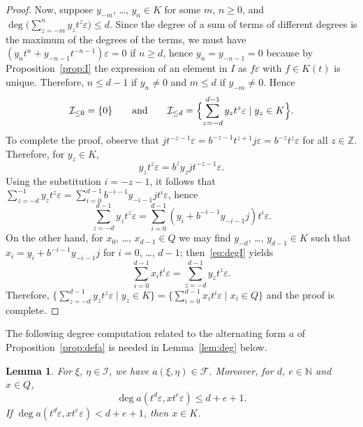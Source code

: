 \documentclass{amsart}
\newcommand{\calI}{\mathcal{I}}
\newcommand{\Z}{\mathbb{Z}}
\newcommand{\fq}{\mathcal{F}}
\newtheorem{lemma}[prop]{Lemma}
\theoremstyle{remark}
\begin{document}
\begin{proof}
  Now, suppose $y_{-m}$, \ldots, $y_n\in K$ for some $m$, $n\geq0$,
  and
  $
    \deg\bigl(\sum_{z=-m}^ny_zt^z\varepsilon\bigr) \leq d.
  $
  Since the degree of a sum of terms of different degrees is the
  maximum of the degrees of the terms, we must have
  $
   (y_nt^n+y_{-n-1}t^{-n-1})\varepsilon = 0$ if $n\geq d$, hence $y_n=y_{-n-1}=0$ because by
    Proposition~\ref{prop:I} the expression of an element in $I$ as
    $f\varepsilon$ with $f\in K(t)$ is unique. Therefore, $n\leq d-1$
    if $y_n\neq0$ and $m\leq d$ 
  if $y_{-m}\neq0$. Hence
  \[
    \calI_{\leq0}=\{0\} \qquad\text{and}\qquad
    \calI_{\leq d} = \Bigl\{\sum_{z=-d}^{d-1} y_zt^z\varepsilon \mid
    y_z\in K\Bigr\}.
  \]
  To complete the proof, observe that $jt^{-z-1}\varepsilon =
  b^{-z-1}t^{z+1}j\varepsilon= b^{-z}t^z\varepsilon$ for all
  $z\in\Z$. Therefore, for $y_z\in K$,
  \[
    y_zt^z\varepsilon = b^zy_zjt^{-z-1}\varepsilon.
  \]
  Using the substitution $i=-z-1$, it follows that $\sum_{z=-d}^{-1}
  y_zt^z\varepsilon = 
  \sum_{i=0}^{d-1} b^{-i-1}y_{-i-1}jt^i\varepsilon$, hence
  \begin{equation}
    \label{eq:degI}
    \sum_{z=-d}^{d-1} y_zt^z\varepsilon = \sum_{i=0}^{d-1}
    (y_i+b^{-i-1}y_{-i-1}j)t^i\varepsilon. 
  \end{equation}
  On the other hand, for $x_0$, \ldots, $x_{d-1}\in Q$ we may find
  $y_{-d}$, \ldots, $y_{d-1}\in K$ such that $x_i=y_i+b^{-i-1}y_{-i-1}j$
  for $i=0$, \ldots, $d-1$; then~\eqref{eq:degI} yields
  \[
    \sum_{i=0}^{d-1}x_it^i\varepsilon = \sum_{z=-d}^{d-1}
    y_zt^z\varepsilon.
  \]
  Therefore, $
    \bigl\{ \sum_{z=-d}^{d-1} y_zt^z\varepsilon\mid y_z\in K\bigr\} =
    \bigl\{\sum_{i=0}^{d-1} x_it^i\varepsilon \mid x_i\in Q\bigr\}$
    and the proof is complete.
  \end{proof}

The following degree computation related to the alternating form $a$
of Proposition~\ref{prop:defa} is needed in Lemma~\ref{lem:deg} below.

\begin{lemma}
  \label{lem:degcomp}
  For $\xi$, $\eta\in\calI$, we have $a(\xi,\eta)\in\fq$. Moreover,
  for $d$, $e\in\mathbb{N}$ and $x\in Q$,
  \[
    \deg a(t^d\varepsilon, xt^e\varepsilon) \leq d+e+1.
  \]
  If $\deg a(t^d\varepsilon, xt^e\varepsilon)< d+e+1$, then $x\in K$.
\end{lemma}
\end{document}
